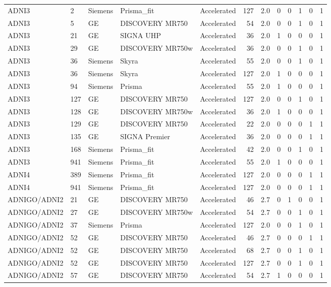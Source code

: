 \documentclass{article}
\begin{document}
\begin{landscape}
\begin{longtable}{lllllrrrrrrr}
ADNI3 & 2 & Siemens & Prisma\_fit & Accelerated & 127 & 2.0 & 0 & 0 & 1 & 0 & 1 \\
ADNI3 & 5 & GE & DISCOVERY MR750 & Accelerated & 54 & 2.0 & 0 & 0 & 1 & 0 & 1 \\
ADNI3 & 21 & GE & SIGNA UHP & Accelerated & 36 & 2.0 & 1 & 0 & 0 & 0 & 1 \\
ADNI3 & 29 & GE & DISCOVERY MR750w & Accelerated & 36 & 2.0 & 0 & 0 & 1 & 0 & 1 \\
ADNI3 & 36 & Siemens & Skyra & Accelerated & 55 & 2.0 & 0 & 0 & 1 & 0 & 1 \\
ADNI3 & 36 & Siemens & Skyra & Accelerated & 127 & 2.0 & 1 & 0 & 0 & 0 & 1 \\
ADNI3 & 94 & Siemens & Prisma & Accelerated & 55 & 2.0 & 1 & 0 & 0 & 0 & 1 \\
ADNI3 & 127 & GE & DISCOVERY MR750 & Accelerated & 127 & 2.0 & 0 & 0 & 1 & 0 & 1 \\
ADNI3 & 128 & GE & DISCOVERY MR750w & Accelerated & 36 & 2.0 & 1 & 0 & 0 & 0 & 1 \\
ADNI3 & 129 & GE & DISCOVERY MR750 & Accelerated & 22 & 2.0 & 0 & 0 & 0 & 1 & 1 \\
ADNI3 & 135 & GE & SIGNA Premier & Accelerated & 36 & 2.0 & 0 & 0 & 0 & 1 & 1 \\
ADNI3 & 168 & Siemens & Prisma\_fit & Accelerated & 42 & 2.0 & 0 & 0 & 1 & 0 & 1 \\
ADNI3 & 941 & Siemens & Prisma\_fit & Accelerated & 55 & 2.0 & 1 & 0 & 0 & 0 & 1 \\
ADNI4 & 389 & Siemens & Prisma\_fit & Accelerated & 127 & 2.0 & 0 & 0 & 0 & 1 & 1 \\
ADNI4 & 941 & Siemens & Prisma\_fit & Accelerated & 127 & 2.0 & 0 & 0 & 0 & 1 & 1 \\
ADNIGO/ADNI2 & 21 & GE & DISCOVERY MR750 & Accelerated & 46 & 2.7 & 0 & 1 & 0 & 0 & 1 \\
ADNIGO/ADNI2 & 27 & GE & DISCOVERY MR750w & Accelerated & 54 & 2.7 & 0 & 0 & 1 & 0 & 1 \\
ADNIGO/ADNI2 & 37 & Siemens & Prisma & Accelerated & 127 & 2.0 & 0 & 0 & 1 & 0 & 1 \\
ADNIGO/ADNI2 & 52 & GE & DISCOVERY MR750 & Accelerated & 46 & 2.7 & 0 & 0 & 0 & 1 & 1 \\
ADNIGO/ADNI2 & 52 & GE & DISCOVERY MR750 & Accelerated & 68 & 2.7 & 0 & 0 & 1 & 0 & 1 \\
ADNIGO/ADNI2 & 52 & GE & DISCOVERY MR750 & Accelerated & 127 & 2.7 & 0 & 0 & 1 & 0 & 1 \\
ADNIGO/ADNI2 & 57 & GE & DISCOVERY MR750 & Accelerated & 54 & 2.7 & 1 & 0 & 0 & 0 & 1 \\

\end{longtable}
\end{landscape}
\end{document}
